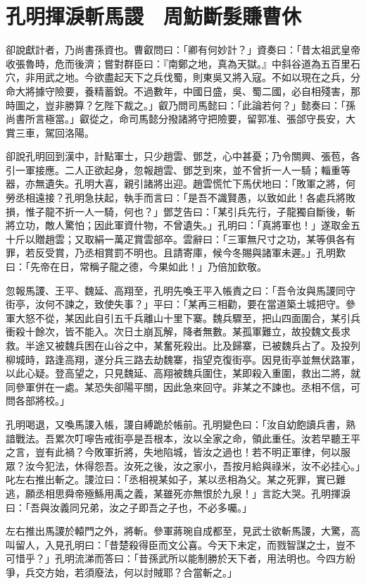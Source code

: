 
\chapter{孔明揮淚斬馬謖　周魴斷髮賺曹休}

卻說獻計者，乃尚書孫資也。曹叡問曰：「卿有何妙計？」資奏曰：「昔太祖武皇帝收張魯時，危而後濟；嘗對群臣曰：『南鄭之地，真為天獄。』中斜谷道為五百里石穴，非用武之地。今欲盡起天下之兵伐蜀，則東吳又將入寇。不如以現在之兵，分命大將據守險要，養精蓄銳。不過數年，中國日盛，吳、蜀二國，必自相殘害，那時圖之，豈非勝算？乞陛下裁之。」叡乃問司馬懿曰：「此論若何？」懿奏曰：「孫尚書所言極當。」叡從之，命司馬懿分撥諸將守把險要，留郭准、張郃守長安，大賞三車，駕回洛陽。

卻說孔明回到漢中，計點軍士，只少趙雲、鄧芝，心中甚憂；乃令關興、張苞，各引一軍接應。二人正欲起身，忽報趙雲、鄧芝到來，並不曾折一人一騎；輜重等器，亦無遺失。孔明大喜，親引諸將出迎。趙雲慌忙下馬伏地曰：「敗軍之將，何勞丞相遠接？孔明急扶起，執手而言曰：「是吾不識賢愚，以致如此！各處兵將敗損，惟子龍不折一人一騎，何也？」鄧芝告曰：「某引兵先行，子龍獨自斷後，斬將立功，敵人驚怕；因此軍資什物，不曾遺失。」孔明曰：「真將軍也！」遂取金五十斤以贈趙雲；又取絹一萬疋賞雲部卒。雲辭曰：「三軍無尺寸之功，某等俱各有罪，若反受賞，乃丞相賞罰不明也。且請寄庫，候今冬賜與諸軍未遲。」孔明歎曰：「先帝在日，常稱子龍之德，今果如此！」乃倍加欽敬。

忽報馬謖、王平、魏延、高翔至，孔明先喚王平入帳責之曰：「吾令汝與馬謖同守街亭，汝何不諫之，致使失事？」平曰：「某再三相勸，要在當道築土城把守。參軍大怒不從，某因此自引五千兵離山十里下寨。魏兵驟至，把山四面圍合，某引兵衝殺十餘次，皆不能入。次日土崩瓦解，降者無數。某孤軍難立，故投魏文長求救。半途又被魏兵困在山谷之中，某奮死殺出。比及歸寨，已被魏兵占了。及投列柳城時，路逢高翔，遂分兵三路去劫魏寨，指望克復街亭。因見街亭並無伏路軍，以此心疑。登高望之，只見魏延、高翔被魏兵圍住，某即殺入重圍，救出二將，就同參軍併在一處。某恐失卻陽平關，因此急來回守。非某之不諫也。丞相不信，可問各部將校。」

孔明喝退，又喚馬謖入帳，謖自縛跪於帳前。孔明變色曰：「汝自幼飽讀兵書，熟諳戰法。吾累次叮嚀告戒街亭是吾根本，汝以全家之命，領此重任。汝若早聽王平之言，豈有此禍？今敗軍折將，失地陷城，皆汝之過也！若不明正軍律，何以服眾？汝今犯法，休得怨吾。汝死之後，汝之家小，吾按月給與祿米，汝不必挂心。」叱左右推出斬之。謖泣曰：「丞相視某如子，某以丞相為父。某之死罪，實已難逃，願丞相思舜帝殛鯀用禹之義，某雖死亦無恨於九泉！」言訖大哭。孔明揮淚曰：「吾與汝義同兄弟，汝之子即吾之子也，不必多囑。」

左右推出馬謖於轅門之外，將斬。參軍蔣琬自成都至，見武士欲斬馬謖，大驚，高叫留人，入見孔明曰：「昔楚殺得臣而文公喜。今天下未定，而戮智謀之士，豈不可惜乎？」孔明流涕而答曰：「昔孫武所以能制勝於天下者，用法明也。今四方紛爭，兵交方始，若須廢法，何以討賊耶？合當斬之。」

